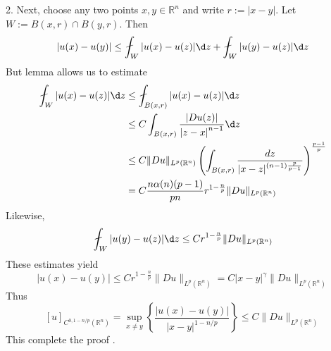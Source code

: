 \begin{theorem}
    2. Next, choose any two points $x, y \in \mathbb{R}^n$ and write $r:=|x-y|$. Let $W:=B(x, r) \cap B(y, r)$. Then
    $$
        |u(x)-u(y)| \leq \fint_W|u(x)-u(z)| \d  z+ \fint_W|u(y)-u(z)| \d z
    $$
    But lemma allows us to estimate
    \begin{equation*}
        \begin{aligned}
            \fint_W|u(x)-u(z)| \d  z
             & \leq \fint_{B(x, r)}|u(x)-u(z)| \d  z                                                  \\
             & \leq C  \int_{B(x,r)} \frac{\left|D u(z)\right| }{\left|z-x\right|^{n-1}}\d z          \\
             & \leq C \|Du\|_{L^p(\mathbb{R}^n)}
            \left(\int_{B(x, r)} \frac{d z}{|x-z|^{(n-1) \frac{p}{p-1}}}\right)^{\frac{p-1}{p}}       \\
             & = C \frac{n\alpha(n)(p-1)}{pn} r^{1-\frac{n}{p}}\|D u\|_{L^p\left(\mathbb{R}^n\right)}
        \end{aligned}
    \end{equation*}
    Likewise,
    $$
        \fint_W|u(y)-u(z)| \d  z \leq C r^{1-\frac{n}{p}}\|D u\|_{L^p\left(\mathbb{R}^n\right)}
    $$
    These estimates  yield
    $$
        |u(x)-u(y)| \leq C r^{1-\frac{n}{p}}\|D u\|_{L^p\left(\mathbb{R}^n\right)}=C|x-y|^{\gamma}\|D u\|_{L^p\left(\mathbb{R}^n\right)}
    $$
    Thus
    $$
        [u]_{C^{0,1-n / p}\left(\mathbb{R}^n\right)}=\sup _{x \neq y}\left\{\frac{|u(x)-u(y)|}{|x-y|^{1-n / p}}\right\} \leq C\|D u\|_{L^p\left(\mathbb{R}^n\right)}
    $$
    This complete the proof .
\end{theorem}

